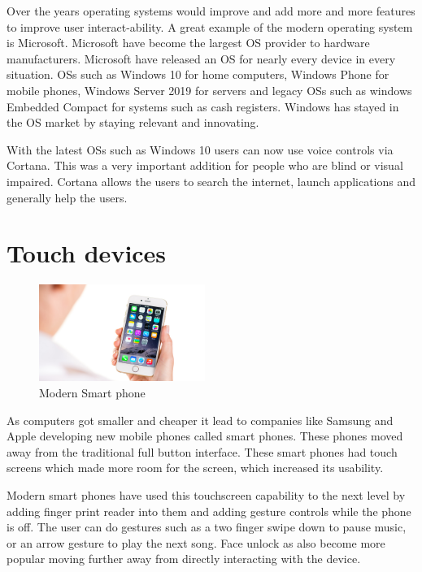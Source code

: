 Over the years operating systems would improve and add more and more features to improve user interact-ability. A great example of the modern operating system is Microsoft. Microsoft have become the largest OS provider to hardware manufacturers. Microsoft have released an OS for nearly every device in every situation. OSs such as Windows 10 for home computers, Windows Phone for mobile phones, Windows Server 2019 for servers and legacy OSs such as windows Embedded Compact for systems such as cash registers. Windows has stayed in the OS market by staying relevant and innovating.

With the latest OSs such as Windows 10 users can now use voice controls via Cortana. This was a very important addition for people who are blind or visual impaired. Cortana allows the users to search the internet, launch applications and generally help the users.

\section{Touch devices}

\begin{figure}
  \begin{center}
    \includegraphics[width=0.48\textwidth]{img/smartphone.jpg}
  \end{center}
  \caption{Modern Smart phone}
\end{figure}

As computers got smaller and cheaper it lead to companies like Samsung and Apple developing new mobile phones called smart phones. These phones moved away from the traditional full button interface. These smart phones had touch screens which made more room for the screen, which increased its usability.

Modern smart phones have used this touchscreen capability to the next level by adding finger print reader into them and adding gesture controls while the phone is off. The user can do gestures such as a two finger swipe down to pause music, or an arrow gesture to play the next song. Face unlock as also become more popular moving further away from directly interacting with the device.
